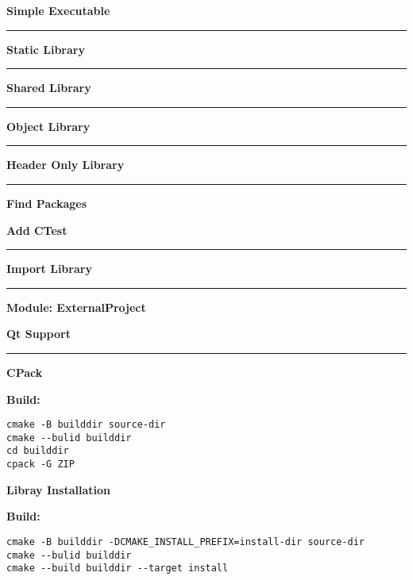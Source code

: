\documentclass{article}
\begin{document}
\begin{minipage}[t]{0.20\linewidth}
\textbf{Simple Executable}

\noindent\rule{\textwidth}{0.1pt}
\textbf{Static Library}

\noindent\rule{\textwidth}{0.1pt}
\textbf{Shared Library}

\noindent\rule{\textwidth}{0.1pt}
\textbf{Object Library}

\noindent\rule{\textwidth}{0.1pt}
\textbf{Header Only Library}

\noindent\rule{\textwidth}{0.1pt}
\textbf{Find Packages}

\end{minipage}
\hfill\vline\hfill
\begin{minipage}[t]{0.26\linewidth}
\textbf{Add CTest}

\noindent\rule{\textwidth}{0.1pt}
\textbf{Import Library}

\noindent\rule{\textwidth}{0.1pt}
\textbf{Module: ExternalProject}

\end{minipage}
\hfill\vline\hfill
\begin{minipage}[t]{0.20\linewidth}
\textbf{Qt Support}

\noindent\rule{\textwidth}{0.1pt}
\textbf{CPack}

\textbf{Build:}
\begin{verbatim}
cmake -B builddir source-dir
cmake --bulid builddir
cd builddir
cpack -G ZIP
\end{verbatim}
\end{minipage}
\hfill\vline\hfill
\begin{minipage}[t]{0.25\linewidth}
\textbf{Libray Installation}

\textbf{Build:}
\begin{verbatim}
cmake -B builddir -DCMAKE_INSTALL_PREFIX=install-dir source-dir
cmake --bulid builddir
cmake --build builddir --target install
\end{verbatim}
\end{minipage}
\end{document}
